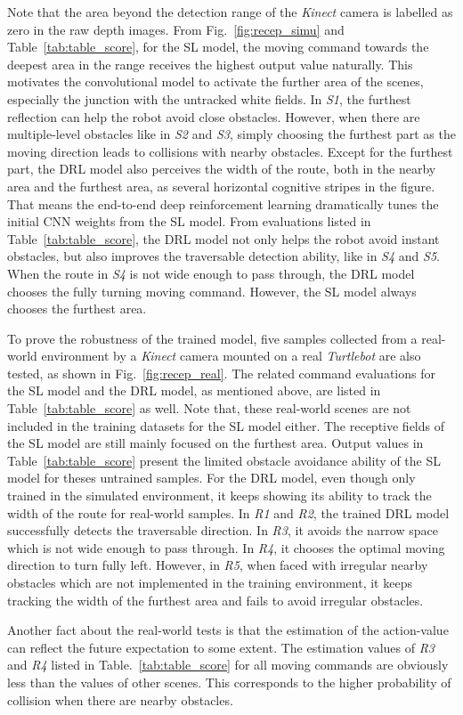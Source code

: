 Note that the area beyond the detection range of the \textit{Kinect} camera is labelled as zero in the raw depth images. From Fig.~\ref{fig:recep_simu} and Table~\ref{tab:table_score}, for the SL model, the moving command towards the deepest area in the range receives the highest output value naturally. This motivates the convolutional model to activate the further area of the scenes, especially the junction with the untracked white fields. In \textit{S1}, the furthest reflection can help the robot avoid close obstacles. However, when there are multiple-level obstacles like in \textit{S2} and \textit{S3}, simply choosing the furthest part as the moving direction leads to collisions with nearby obstacles. Except for the furthest part, the DRL model also perceives the width of the route, both in the nearby area and the furthest area, as several horizontal cognitive stripes in the figure. That means the end-to-end deep reinforcement learning dramatically tunes the initial CNN weights from the SL model. From evaluations listed in Table~\ref{tab:table_score}, the DRL model not only helps the robot avoid instant obstacles, but also improves the traversable detection ability, like in \textit{S4} and \textit{S5}.
When the route in \textit{S4} is not wide enough to pass through, the DRL model chooses the fully turning moving command. However, the SL model always chooses the furthest area.

To prove the robustness of the trained model, five samples collected from a real-world environment by a \textit{Kinect} camera mounted on a real \textit{Turtlebot} are also tested, as shown in Fig.~\ref{fig:recep_real}. The related command evaluations for the SL model and the DRL model, as mentioned above, are listed in Table~\ref{tab:table_score} as well. Note that, these real-world scenes are not included in the training datasets for the SL model \cite{tai2016deep} either. The receptive fields of the SL model are still mainly focused on the furthest area. Output values in Table~\ref{tab:table_score} present the limited obstacle avoidance ability of the SL model for theses untrained samples. For the DRL model, even though only trained in the simulated environment, it keeps showing its ability to track the width of the route for real-world samples. In \textit{R1} and \textit{R2}, the trained DRL model successfully detects the traversable direction.
In \textit{R3}, it avoids the narrow space which is not wide enough to pass through. In \textit{R4}, it chooses the optimal moving direction to turn fully left. However, in \textit{R5}, when faced with irregular nearby obstacles which are not implemented in the training environment, it keeps tracking the width of the furthest area and fails to avoid irregular obstacles.

Another fact about the real-world tests is that the estimation of the action-value can reflect the future expectation to some extent. The estimation values of \textit{R3} and \textit{R4} listed in Table.~\ref{tab:table_score} for all moving commands are obviously less than the values of other scenes. This corresponds to the higher probability of collision when there are nearby obstacles.
